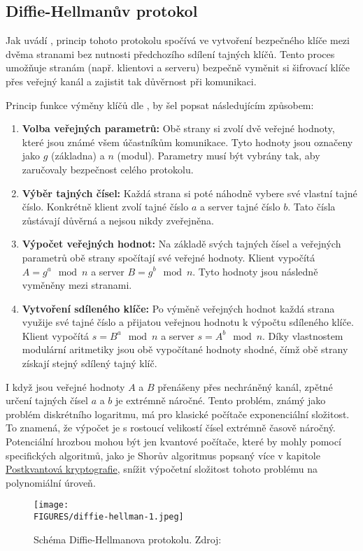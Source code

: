 \subsection{Diffie-Hellmanův protokol}
\label{sec:diffie-hellman}

Jak uvádí \textcite{diffie1976}, princip tohoto protokolu spočívá ve vytvoření bezpečného klíče mezi dvěma stranami bez nutnosti předchozího sdílení tajných klíčů. Tento proces umožňuje stranám (např. klientovi a serveru) bezpečně vyměnit si šifrovací klíče přes veřejný kanál a zajistit tak důvěrnost při komunikaci.

Princip funkce výměny klíčů dle \textcite{diffie1976}, by šel popsat následujícím způsobem: 

\begin{enumerate}
    \item \textbf{Volba veřejných parametrů:} Obě strany si zvolí dvě veřejné hodnoty, které jsou známé všem účastníkům komunikace. Tyto hodnoty jsou označeny jako \(g\) (základna) a \(n\) (modul). Parametry musí být vybrány tak, aby zaručovaly bezpečnost celého protokolu.
    
    \item \textbf{Výběr tajných čísel:} Každá strana si poté náhodně vybere své vlastní tajné číslo. Konkrétně klient zvolí tajné číslo \(a\) a server tajné číslo \(b\). Tato čísla zůstávají důvěrná a nejsou nikdy zveřejněna.
    
    \item \textbf{Výpočet veřejných hodnot:} Na základě svých tajných čísel a veřejných parametrů obě strany spočítají své veřejné hodnoty. Klient vypočítá \(A = g^a \mod n\) a server \(B = g^b \mod n\). Tyto hodnoty jsou následně vyměněny mezi stranami.
    
    \item \textbf{Vytvoření sdíleného klíče:} Po výměně veřejných hodnot každá strana využije své tajné číslo a přijatou veřejnou hodnotu k výpočtu sdíleného klíče. Klient vypočítá \(s = B^a \mod n\) a server \(s = A^b \mod n\). Díky vlastnostem modulární aritmetiky jsou obě vypočítané hodnoty shodné, čímž obě strany získají stejný sdílený tajný klíč.
  \end{enumerate}

I když jsou veřejné hodnoty \(A\) a \(B\) přenášeny přes nechráněný kanál, zpětné určení tajných čísel \(a\) a \(b\) je extrémně náročné. Tento problém, známý jako problém diskrétního logaritmu, má pro klasické počítače exponenciální složitost. To znamená, že výpočet je s rostoucí velikostí čísel extrémně časově náročný. Potenciální hrozbou mohou být jen kvantové počítače, které by mohly pomocí specifických algoritmů, jako je Shorův algoritmus popsaný více v kapitole \hyperref[sec:postkvantova-kryptografie]{Postkvantová kryptografie}, snížit výpočetní složitost tohoto problému na polynomiální úroveň.

\begin{figure}[htbp]
    \centering
    \texttt{[image: \\FIGURES/diffie-hellman-1.jpeg]}
    \caption{Schéma Diffie-Hellmanova protokolu. Zdroj: \parencite{diffie-hellman-1}}
    \label{fig:diffie-hellman}
  \end{figure}

\newpage